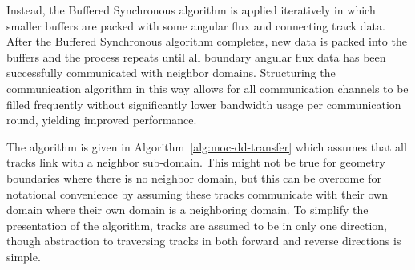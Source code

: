 Instead, the Buffered Synchronous algorithm is applied iteratively in which smaller buffers are packed with some angular flux and connecting track data. After the Buffered Synchronous algorithm completes, new data is packed into the buffers and the process repeats until all boundary angular flux data has been successfully communicated with neighbor domains. Structuring the communication algorithm in this way allows for all communication channels to be filled frequently without significantly lower bandwidth usage per communication round, yielding improved performance. 

The algorithm is given in Algorithm~\ref{alg:moc-dd-transfer} which assumes that all tracks link with a neighbor sub-domain. This might not be true for geometry boundaries where there is no neighbor domain, but this can be overcome for notational convenience by assuming these tracks communicate with their own domain where their own domain is a neighboring domain. To simplify the presentation of the algorithm, tracks are assumed to be in only one direction, though abstraction to traversing tracks in both forward and reverse directions is simple.

